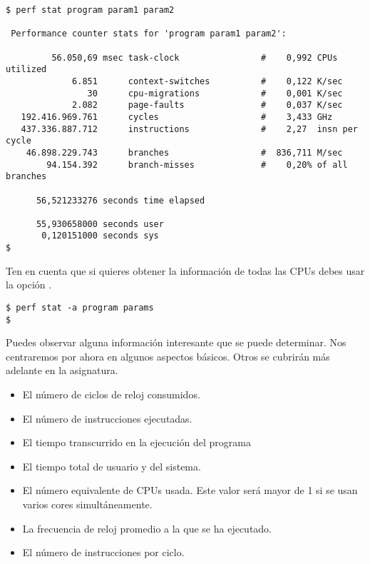 \begin{lstlisting}[style=terminal,basicstyle=\ttfamily]
$ perf stat program param1 param2

 Performance counter stats for 'program param1 param2':

         56.050,69 msec task-clock                #    0,992 CPUs utilized          
             6.851      context-switches          #    0,122 K/sec                  
                30      cpu-migrations            #    0,001 K/sec                  
             2.082      page-faults               #    0,037 K/sec                  
   192.416.969.761      cycles                    #    3,433 GHz                    
   437.336.887.712      instructions              #    2,27  insn per cycle         
    46.898.229.743      branches                  #  836,711 M/sec                  
        94.154.392      branch-misses             #    0,20% of all branches        

      56,521233276 seconds time elapsed

      55,930658000 seconds user
       0,120151000 seconds sys
$
\end{lstlisting}

Ten en cuenta que si quieres obtener la información de todas las CPUs
debes usar la opción .

\begin{lstlisting}[style=terminal]
$ perf stat -a program params
$
\end{lstlisting}

Puedes observar alguna información interesante que se puede determinar.
Nos centraremos por ahora en algunos aspectos básicos. Otros se
cubrirán más adelante en la asignatura.

\begin{itemize}
  \item El número de ciclos de reloj consumidos.
  \item El número de instrucciones ejecutadas.
  \item El tiempo transcurrido en la ejecución del programa
  \item El tiempo total de usuario y del sistema.
  \item El número equivalente de CPUs usada. Este valor será mayor de 1 si
        se usan varios cores simultáneamente.
  \item La frecuencia de reloj promedio a la que se ha ejecutado.
  \item El número de instrucciones por ciclo.
\end{itemize}

